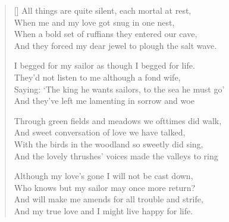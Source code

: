 \settowidth{\versewidth}{When a bold set of ruffians they entered our cave,}


\begin{verse}[\versewidth]
All things are quite silent, each mortal at rest,\\
When me and my love got snug in one nest,\\
When a bold set of ruffians they entered our cave,\\
And they forced my dear jewel to plough the salt wave.

I begged for my sailor as though I begged for life.\\
They'd not listen to me although a fond wife,\\
Saying: `The king he wants sailors, to the sea he must go'\\
And they've left me lamenting in sorrow and woe

Through green fields and meadows we ofttimes did walk,\\
And sweet conversation of love we have talked,\\
With the birds in the woodland so sweetly did sing,\\
And the lovely thrushes' voices made the valleys to ring

Although my love's gone I will not be cast down,\\
Who knows but my sailor may once more return?\\
And will make me amends for all trouble and strife,\\
And my true love and I might live happy for life.
\end{verse}
